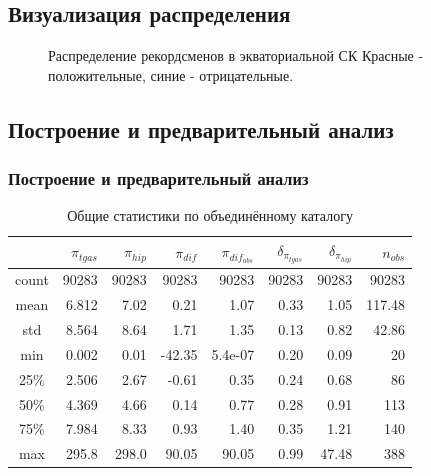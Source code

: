 \documentclass[12pt,aspectratio=43]{beamer}
\begin{document}
\subsection{Визуализация распределения}\label{sub:smthrs}

\begin{frame}[<alignment>]

\begin{figure}[h!]
\caption{Распределение рекордсменов в экваториальной СК  Красные - положительные, синие - отрицательные.}
\end{figure}
\end{frame}




\subsection{Построение и предварительный анализ}\label{errvid}

\begin{frame}[squeeze, shrink=5]
\frametitle{Построение и предварительный анализ}
\begin{table}[h!]
\caption{Общие статистики по объединённому каталогу}
\label{tabular:tgas_st}
\begin{tabular}{c|r|r|r|r|r|r|r}
\hline 	
&$\pi_{tgas}$&$\pi_{hip}$&$\pi_{dif}$&$\pi_{dif_{abs}}$&$\delta_{\pi_{tgas}}$&$\delta_{\pi_{hip}}$&$n_{obs}$\\
\hline
\hline 	
count&90283&90283&90283&90283&90283&90283&90283\\
\hline 
mean&6.812&7.02&0.21&1.07&0.33&1.05&117.48\\
std&8.564&8.64&1.71&1.35&0.13&0.82&42.86\\
min&0.002&0.01&-42.35&5.4e-07&0.20&0.09&20\\
25\%&2.506&2.67&-0.61&0.35&0.24&0.68&86\\
50\%&4.369&4.66&0.14&0.77&0.28&0.91&113\\
75\%&7.984&8.33&0.93&1.40&0.35&1.21&140\\
max&295.8&298.0&90.05&90.05&0.99&47.48&388\\
\end{tabular}
\end{table}

\end{frame}	
\end{document}
